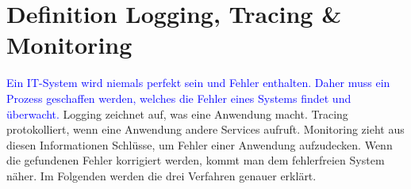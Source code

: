 \chapter{Definition Logging, Tracing {\selectfont \&} Monitoring}\label{ch:definition-von-logging-tracing-&-monitoring}
\textcolor{blue}{
    Ein IT-System wird niemals perfekt sein und Fehler enthalten.
    Daher muss ein Prozess geschaffen werden, welches die Fehler eines Systems findet und überwacht.}\autocite{cloudradar}
Logging zeichnet auf, was eine Anwendung macht.
Tracing protokolliert, wenn eine Anwendung andere Services aufruft.
Monitoring zieht aus diesen Informationen Schlüsse, um Fehler einer Anwendung aufzudecken.
Wenn die gefundenen Fehler korrigiert werden, kommt man dem fehlerfreien System näher.
Im Folgenden werden die drei Verfahren genauer erklärt.


